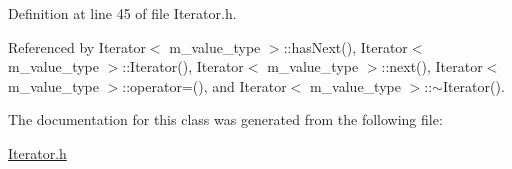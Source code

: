 Definition at line 45 of file Iterator.h.

Referenced by Iterator$<$ m\_\-value\_\-type $>$::has\-Next(), Iterator$<$ m\_\-value\_\-type $>$::Iterator(), Iterator$<$ m\_\-value\_\-type $>$::next(), Iterator$<$ m\_\-value\_\-type $>$::operator=(), and Iterator$<$ m\_\-value\_\-type $>$::$\sim$Iterator().

The documentation for this class was generated from the following file:\begin{CompactItemize}
\item 
\hyperlink{Iterator_8h}{Iterator.h}\end{CompactItemize}
